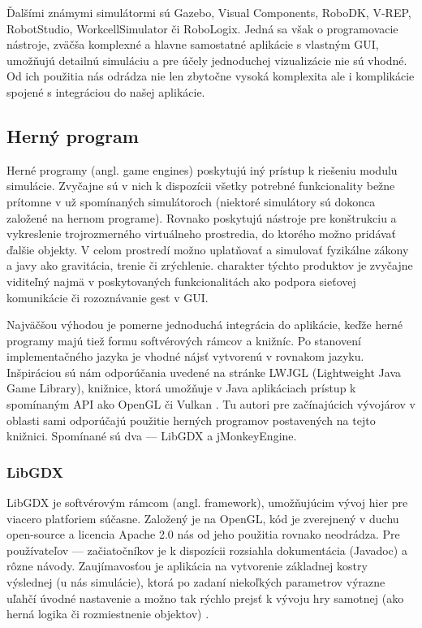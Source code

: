 Ďalšími známymi simulátormi sú Gazebo, Visual Components, RoboDK, V-REP, RobotStudio, WorkcellSimulator či RoboLogix. Jedná sa však o programovacie nástroje, zväčša komplexné a hlavne samostatné aplikácie s vlastným GUI, umožňujú detailnú simuláciu a pre účely jednoduchej vizualizácie nie sú vhodné. Od ich použitia nás odrádza nie len zbytočne vysoká komplexita ale i komplikácie spojené s integráciou do našej aplikácie.

\subsection{Herný program}
\label{sub:herny-program}
Herné programy (angl. game engines) poskytujú iný prístup k riešeniu modulu simulácie. Zvyčajne sú v nich k dispozícii všetky potrebné funkcionality bežne prítomne v už spomínaných simulátoroch (niektoré simulátory sú dokonca založené na hernom programe). Rovnako poskytujú nástroje pre konštrukciu a vykreslenie trojrozmerného virtuálneho prostredia, do ktorého možno pridávať ďalšie objekty. V celom prostredí možno uplatňovať a simulovať fyzikálne zákony a javy ako gravitácia, trenie či zrýchlenie.  charakter týchto produktov je zvyčajne viditeľný najmä v poskytovaných funkcionalitách ako podpora sieťovej komunikácie či rozoznávanie gest v GUI.

Najväčšou výhodou je pomerne jednoduchá integrácia do aplikácie, keďže herné programy majú tiež formu softvérových rámcov a knižníc. Po stanovení implementačného jazyka je vhodné nájsť  vytvorenú v rovnakom jazyku. Inšpiráciou sú nám odporúčania uvedené na stránke LWJGL (Lightweight Java Game Library), knižnice, ktorá umožňuje v Java aplikáciach prístup k spomínaným API ako OpenGL či Vulkan \cite{LWJGL}. Tu autori pre začínajúcich vývojárov v oblasti sami odporúčajú použitie herných programov postavených na tejto knižnici. Spomínané sú dva --- LibGDX a jMonkeyEngine.

\subsubsection{LibGDX}
LibGDX je softvérovým rámcom (angl. framework), umožňujúcim vývoj hier pre viacero platforiem súčasne. Založený je na OpenGL, kód je zverejnený v duchu open-source a licencia Apache 2.0 nás od jeho použitia rovnako neodrádza. Pre používateľov --- začiatočníkov je k dispozícii rozsiahla dokumentácia (Javadoc) a rôzne návody. Zaujímavosťou je aplikácia na vytvorenie základnej kostry výslednej  (u nás simulácie), ktorá po zadaní niekoľkých parametrov výrazne uľahčí úvodné nastavenie a možno tak rýchlo prejsť k vývoju hry samotnej (ako herná logika či rozmiestnenie objektov) \cite{LibGDXProjectGenerator}.

